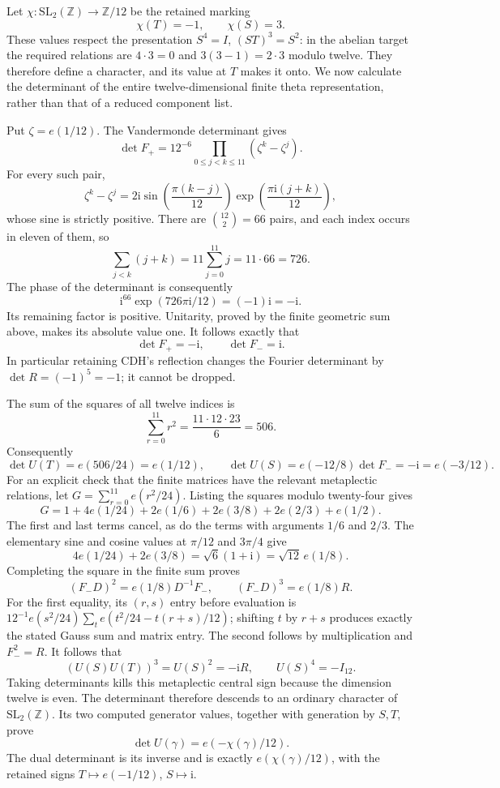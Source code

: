 Let $\chi:\mathrm{SL}_2(\mathbb Z)\to\mathbb Z/12$ be the retained
marking
\[
 \chi(T)=-1,\qquad \chi(S)=3.
\]
These values respect the presentation
$S^4=I$, $(ST)^3=S^2$: in the abelian target the required relations
are $4\cdot3=0$ and $3(3-1)=2\cdot3$ modulo twelve.
They therefore define a character, and its value at $T$ makes it onto.
We now calculate the determinant of the entire twelve-dimensional
finite theta representation, rather than that of a reduced component
list.

Put $\zeta=e(1/12)$.  The Vandermonde determinant gives
\[
 \det F_+=12^{-6}\prod_{0\le j<k\le11}(\zeta^k-\zeta^j).
\]
For every such pair,
\[
 \zeta^k-\zeta^j
 =2\mathrm i\sin\!\left(\frac{\pi(k-j)}{12}\right)
       \exp\!\left(\frac{\pi\mathrm i(j+k)}{12}\right),
\]
whose sine is strictly positive.  There are $\binom{12}{2}=66$ pairs,
and each index occurs in eleven of them, so
\[
 \sum_{j<k}(j+k)=11\sum_{j=0}^{11}j=11\cdot66=726.
\]
The phase of the determinant is consequently
\[
 \mathrm i^{66}\exp(726\pi\mathrm i/12)=(-1)\mathrm i=-\mathrm i.
\]
Its remaining factor is positive.  Unitarity, proved by the finite
geometric sum above, makes its absolute value one.  It follows exactly
that
\[
 \boxed{\det F_+=-\mathrm i,\qquad\det F_-=\mathrm i.}
\]
In particular retaining CDH's reflection changes the Fourier determinant
by $\det R=(-1)^5=-1$; it cannot be dropped.

The sum of the squares of all twelve indices is
\[
 \sum_{r=0}^{11}r^2=\frac{11\cdot12\cdot23}{6}=506.
\]
Consequently
\[
 \boxed{\det U(T)=e(506/24)=e(1/12),\qquad
 \det U(S)=e(-12/8)\det F_-=-\mathrm i=e(-3/12).}
\]
For an explicit check that the finite matrices have the relevant
metaplectic relations, let
$G=\sum_{r=0}^{11}e(r^2/24)$.  Listing the squares modulo twenty-four
gives
\[
 G=1+4e(1/24)+2e(1/6)+2e(3/8)+2e(2/3)+e(1/2).
\]
The first and last terms cancel, as do the terms with arguments $1/6$
and $2/3$.  The elementary sine and cosine values at $\pi/12$ and
$3\pi/4$ give
\[
 4e(1/24)+2e(3/8)=\sqrt6(1+\mathrm i)
 =\sqrt{12}\,e(1/8).
\]
Completing the square in the finite sum proves
\[
 (F_-D)^2=e(1/8)D^{-1}F_-,\qquad
 (F_-D)^3=e(1/8)R.
\]
For the first equality, its $(r,s)$ entry before evaluation is
$12^{-1}e(s^2/24)\sum_te(t^2/24-t(r+s)/12)$; shifting $t$ by
$r+s$ produces exactly the stated Gauss sum and matrix entry.
The second follows by multiplication and $F_-^2=R$.
It follows that
\[
 (U(S)U(T))^3=U(S)^2=-\mathrm iR,\qquad U(S)^4=-I_{12}.
\]
Taking determinants kills this metaplectic central sign because the
dimension twelve is even.  The determinant therefore descends to an
ordinary character of $\mathrm{SL}_2(\mathbb Z)$.  Its two computed
generator values, together with generation by $S,T$, prove
\[
 \boxed{\det U(\gamma)=e(-\chi(\gamma)/12).}
\]
The dual determinant is its inverse and is exactly
$e(\chi(\gamma)/12)$, with the retained signs $T\mapsto e(-1/12)$,
$S\mapsto\mathrm i$.

